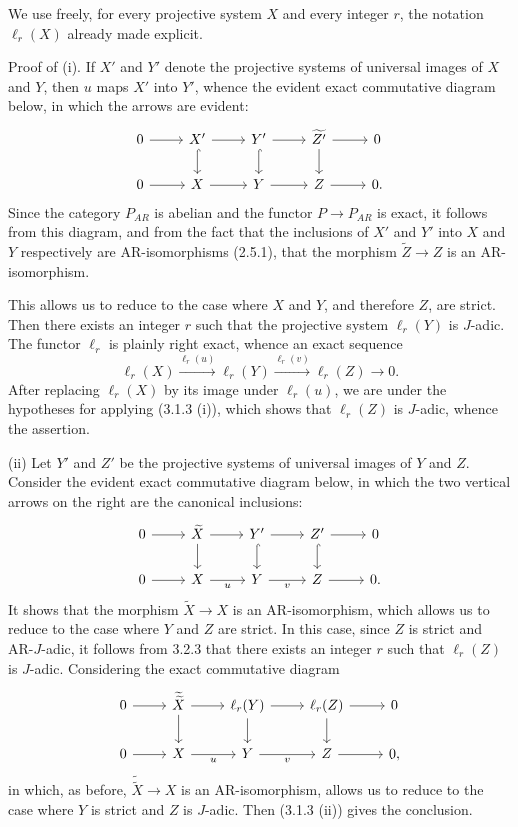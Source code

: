 \begin{prooftext}[Proof]
We use freely, for every projective system $X$ and every integer $r$, the notation $\ell_r(X)$ already made explicit.

Proof of (i). If $X'$ and $Y'$ denote the projective systems of universal images of $X$ and $Y$, then $u$ maps $X'$ into $Y'$, whence the evident exact commutative diagram below, in which the arrows are evident:
\[
\begin{tikzcd}
0 \arrow[r] & X' \arrow[r] \arrow[d,hook] & Y' \arrow[r] \arrow[d,hook] & \widetilde{Z'} \arrow[r] \arrow[d] & 0\\
0 \arrow[r] & X \arrow[r] & Y \arrow[r] & Z \arrow[r] & 0 .
\end{tikzcd}
\]
Since the category $P_{AR}$ is abelian and the functor $P\to P_{AR}$ is exact, it follows from this diagram, and from the fact that the inclusions of $X'$ and $Y'$ into $X$ and $Y$ respectively are AR-isomorphisms (2.5.1), that the morphism $\widetilde Z\to Z$ is an AR-isomorphism.

This allows us to reduce to the case where $X$ and $Y$, and therefore $Z$, are strict. Then there exists an integer $r$ such that the projective system $\ell_r(Y)$ is $J$-adic. The functor $\ell_r$ is plainly right exact, whence an exact sequence
\[
\ell_r(X)\stackrel{\ell_r(u)}{\longrightarrow}\ell_r(Y)\stackrel{\ell_r(v)}{\longrightarrow}\ell_r(Z)\longrightarrow0.
\]
After replacing $\ell_r(X)$ by its image under $\ell_r(u)$, we are under the hypotheses for applying (3.1.3 (i)), which shows that $\ell_r(Z)$ is $J$-adic, whence the assertion.

(ii) Let $Y'$ and $Z'$ be the projective systems of universal images of $Y$ and $Z$. Consider the evident exact commutative diagram below, in which the two vertical arrows on the right are the canonical inclusions:
\[
\begin{tikzcd}
0 \arrow[r] & \widetilde X \arrow[r] \arrow[d] & Y' \arrow[r] \arrow[d,hook] & Z' \arrow[r] \arrow[d,hook] & 0\\
0 \arrow[r] & X \arrow[r,"u"'] & Y \arrow[r,"v"'] & Z \arrow[r] & 0 .
\end{tikzcd}
\]
It shows that the morphism $\widetilde X\to X$ is an AR-isomorphism, which allows us to reduce to the case where $Y$ and $Z$ are strict. In this case, since $Z$ is strict and AR-$J$-adic, it follows from 3.2.3 that there exists an integer $r$ such that $\ell_r(Z)$ is $J$-adic. Considering the exact commutative diagram
\[
\begin{tikzcd}
0 \arrow[r] & \widetilde{\widetilde X} \arrow[r] \arrow[d] & \ell_r(Y) \arrow[r] \arrow[d] & \ell_r(Z) \arrow[r] \arrow[d] & 0\\
0 \arrow[r] & X \arrow[r,"u"'] & Y \arrow[r,"v"'] & Z \arrow[r] & 0,
\end{tikzcd}
\]
in which, as before, $\widetilde{\widetilde X}\to X$ is an AR-isomorphism, allows us to reduce to the case where $Y$ is strict and $Z$ is $J$-adic. Then (3.1.3 (ii)) gives the conclusion.
\end{prooftext}

